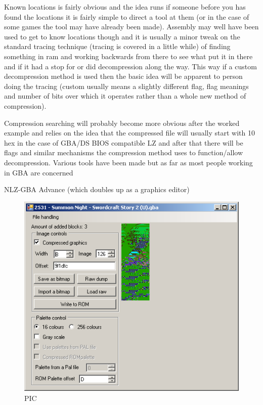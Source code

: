 \documentclass[
]{book}
\begin{document}
Known locations is fairly obvious and the idea runs if someone before you has found the locations it is fairly simple to direct a tool at them (or in the case of some games the tool may have already been made). Assembly may well have been used to get to know locations though and it is usually a minor tweak on the standard tracing technique (tracing is covered in a little while) of finding something in ram and working backwards from there to see what put it in there and if it had a stop for or did decompression along the way. This way if a custom decompression method is used then the basic idea will be apparent to person doing the tracing (custom usually means a slightly different flag, flag meanings and number of bits over which it operates rather than a whole new method of compression).

Compression searching will probably become more obvious after the worked example and relies on the idea that the compressed file will usually start with 10 hex in the case of GBA/DS BIOS compatible LZ and after that there will be flags and similar mechanisms the compression method uses to function/allow decompression. Various tools have been made but as far as most people working in GBA are concerned

NLZ-GBA Advance (which doubles up as a graphics editor)

\begin{figure}
\centering
\includegraphics{images/186_home_fast6191_romhackingguide_unrenamed_fil___ngguidecompressionsearching_NLZGBAadvance_1.png}
\caption{PIC}
\end{figure}
\end{document}
